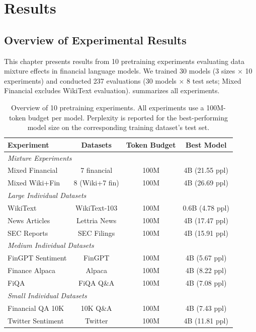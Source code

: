 \chapter{Results}


\section{Overview of Experimental Results}

This chapter presents results from 10 pretraining experiments evaluating data mixture effects in financial language models. We trained 30 models (3 sizes $\times$ 10 experiments) and conducted 237 evaluations (30 models $\times$ 8 test sets; Mixed Financial excludes WikiText evaluation).  summarizes all experiments.

\begin{table}[h]
\centering
\small
\begin{tabular}{lccc}
\toprule
\textbf{Experiment} & \textbf{Datasets} & \textbf{Token Budget} & \textbf{Best Model} \\
\midrule
\multicolumn{4}{l}{\textit{Mixture Experiments}} \\
Mixed Financial & 7 financial & 100M & 4B (21.55 ppl) \\
Mixed Wiki+Fin & 8 (Wiki+7 fin) & 100M & 4B (26.69 ppl) \\
\midrule
\multicolumn{4}{l}{\textit{Large Individual Datasets}} \\
WikiText & WikiText-103 & 100M & 0.6B (4.78 ppl) \\
News Articles & Lettria News & 100M & 4B (17.47 ppl) \\
SEC Reports & SEC Filings & 100M & 4B (15.91 ppl) \\
\midrule
\multicolumn{4}{l}{\textit{Medium Individual Datasets}} \\
FinGPT Sentiment & FinGPT & 100M & 4B (5.67 ppl) \\
Finance Alpaca & Alpaca & 100M & 4B (8.22 ppl) \\
FiQA & FiQA Q\&A & 100M & 4B (7.08 ppl) \\
\midrule
\multicolumn{4}{l}{\textit{Small Individual Datasets}} \\
Financial QA 10K & 10K Q\&A & 100M & 4B (7.43 ppl) \\
Twitter Sentiment & Twitter & 100M & 4B (11.81 ppl) \\
\bottomrule
\end{tabular}
\caption[Overview of Pretraining Experiments]{Overview of 10 pretraining experiments. All experiments use a 100M-token budget per model. Perplexity is reported for the best-performing model size on the corresponding training dataset's test set.}
\label{tab:experiments_overview}
\end{table}

